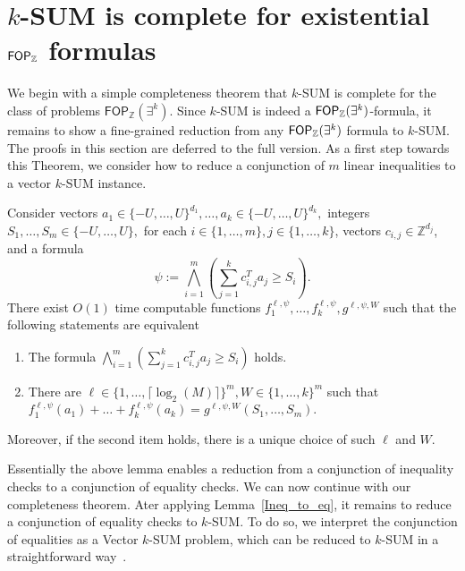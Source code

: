 \section{$k$-SUM is complete for existential $\mathsf{FOP}_{\mathbb{Z}}$ formulas}\label{sec:existentialpa}
We begin with a simple completeness theorem that $k$-SUM is complete for the class of problems $\mathsf{FOP}_{\mathbb{Z}}(\exists^k)$. Since $k$-SUM is indeed a $\mathsf{FOP}_{\mathbb{Z}}(\exists^k)$-formula, it remains to show a fine-grained reduction from any $\mathsf{FOP}_{\mathbb{Z}}(\exists^k)$ formula to $k$-SUM.
The proofs in this section are deferred to the full version.
As a first step towards this Theorem, we consider how to reduce a conjunction of $m$ linear inequalities
to a vector $k$-SUM instance.
\begin{lemma}
  Consider vectors $a_1 \in \{-U, \dots, U\}^{d_1}, \dots, a_k \in \{-U ,\dots,U\}^{d_k},$ integers $S_1, \dots, S_m \in \{-U, \dots, U\},$
  for each $i \in \{1,\dots,m\}, j \in \{1,\dots,k\}$, vectors $c_{i,j} \in \mathbb{Z}^{d_j}$, and a formula $$\psi:=\bigwedge_{i=1}^{m}\left( \sum_{j=1}^{k}c_{i,j}^T a_j \geq S_i\right). $$
  There exist  $O(1)$ time computable functions $f_1^{\ell,\psi} ,\dots ,f_k^{\ell,\psi} ,g^{\ell,\psi,W}$ such that the following statements are equivalent
  \begin{enumerate}
    \item The formula $\bigwedge_{i=1}^{m} \left(\sum_{j=1}^{k}c_{i,j}^T a_j \geq S_i \right)$ holds.
    \item There are $\ell \in \{1,\dots, \lceil \log_2(M)\rceil\}^m, W \in \{1,\dots ,k\}^m$ such that $f^{\ell,\psi}_1 (a_1)+\dots + f^{\ell,\psi}_k (a_k)=g^{\ell,\psi,W} (S_1,\dots,S_m).$
  \end{enumerate}
  Moreover, if the second item holds, there is a unique choice of such $\ell$ and $W$. 
      \label{Ineq_to_eq}
\end{lemma}
Essentially the above lemma enables a reduction from a conjunction of inequality checks to a conjunction of equality checks. We can now continue with our completeness theorem.
\threesumcompl*
Ater applying Lemma~\ref{Ineq_to_eq}, it remains to reduce a conjunction of equality checks to $k$-SUM. To do so, we interpret the conjunction of equalities as a Vector $k$-SUM problem, which can be reduced to $k$-SUM in a straightforward way~\cite{DBLP:journals/corr/AbboudLW13}.
